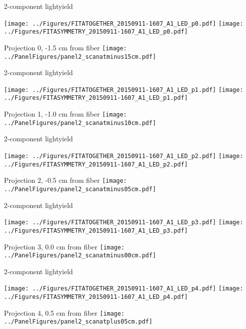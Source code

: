 \documentclass[compress,8pt]{beamer} %
\begin{document}

\begin{frame}{2-component lightyield}
\begin{adjustwidth}{-2em}{-2em}
\texttt{[image: ../Figures/FITATOGETHER\_20150911-1607\_A1\_LED\_p0.pdf]}
\texttt{[image: ../Figures/FITASYMMETRY\_20150911-1607\_A1\_LED\_p0.pdf]}
\end{adjustwidth}
Projection 0, -1.5 cm from fiber
\hfill \texttt{[image: ../PanelFigures/panel2\_scanatminus15cm.pdf]}
\end{frame}

\begin{frame}{2-component lightyield}
\begin{adjustwidth}{-2em}{-2em}
\texttt{[image: ../Figures/FITATOGETHER\_20150911-1607\_A1\_LED\_p1.pdf]}
\texttt{[image: ../Figures/FITASYMMETRY\_20150911-1607\_A1\_LED\_p1.pdf]}
\end{adjustwidth}
Projection 1, -1.0 cm from fiber
\hfill \texttt{[image: ../PanelFigures/panel2\_scanatminus10cm.pdf]}
\end{frame}

\begin{frame}{2-component lightyield}
\begin{adjustwidth}{-2em}{-2em}
\texttt{[image: ../Figures/FITATOGETHER\_20150911-1607\_A1\_LED\_p2.pdf]}
\texttt{[image: ../Figures/FITASYMMETRY\_20150911-1607\_A1\_LED\_p2.pdf]}
\end{adjustwidth}
Projection 2, -0.5 cm from fiber
\hfill \texttt{[image: ../PanelFigures/panel2\_scanatminus05cm.pdf]}
\end{frame}

\begin{frame}{2-component lightyield}
\begin{adjustwidth}{-2em}{-2em}
\texttt{[image: ../Figures/FITATOGETHER\_20150911-1607\_A1\_LED\_p3.pdf]}
\texttt{[image: ../Figures/FITASYMMETRY\_20150911-1607\_A1\_LED\_p3.pdf]}
\end{adjustwidth}
Projection 3, 0.0 cm from fiber
\hfill \texttt{[image: ../PanelFigures/panel2\_scanatminus00cm.pdf]}
\end{frame}

\begin{frame}{2-component lightyield}
\begin{adjustwidth}{-2em}{-2em}
\texttt{[image: ../Figures/FITATOGETHER\_20150911-1607\_A1\_LED\_p4.pdf]}
\texttt{[image: ../Figures/FITASYMMETRY\_20150911-1607\_A1\_LED\_p4.pdf]}
\end{adjustwidth}
Projection 4, 0.5 cm from fiber
\hfill \texttt{[image: ../PanelFigures/panel2\_scanatplus05cm.pdf]}
\end{frame}
\end{document}
